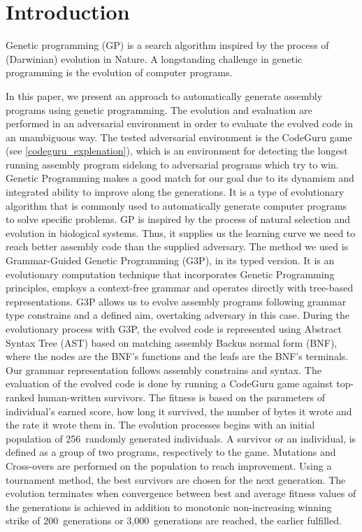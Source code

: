 \documentclass[dvipsnames,format=sigconf,anonymous=true,review=true]{acmart}
\begin{document}
\maketitle

\section{Introduction}
Genetic programming (GP) is a search algorithm inspired by the process of (Darwinian) evolution in Nature. A longstanding challenge in genetic programming is the evolution of computer programs.


In this paper, we present an approach to automatically generate assembly programs using genetic programming. The evolution and evaluation are performed in an adversarial environment in order to evaluate the evolved code in an unambiguous way. The tested adversarial environment is the CodeGuru game (see \autoref{codeguru_explenation}), which is an environment for detecting the longest running assembly program sidelong to adversarial programs which try to win.
Genetic Programming makes a good match for our goal due to its dynamism and integrated ability to improve along the generations. It is a type of evolutionary algorithm that is commonly used to automatically generate computer programs to solve specific problems. GP is inspired by the process of natural selection and evolution in biological systems. Thus, it supplies us the learning curve we need to reach better assembly code than the supplied adversary. The method we used is Grammar-Guided Genetic Programming (G3P), in its typed version. It is an evolutionary computation technique that incorporates Genetic Programming principles, employs a context-free grammar and operates directly with tree-based representations. G3P allows us to evolve assembly programs following grammar type constrains and a defined aim, overtaking adversary in this case. During the evolutionary process with G3P, the evolved code is represented using Abstract Syntax Tree (AST) based on matching assembly Backus normal form (BNF), where the nodes are the BNF's functions and the leafs are the BNF's terminals.
Our grammar representation follows assembly constrains and syntax. The evaluation of the evolved code is done by running a CodeGuru game against top-ranked human-written survivors. The fitness is based on the parameters of individual's earned score, how long it survived, the number of bytes it wrote and the rate it wrote them in. The evolution processes begins with an initial population of 256~randomly generated individuals. A survivor or an individual, is defined as a group of two programs, respectively to the game. Mutations and Cross-overs are performed on the population to reach improvement. Using a tournament method, the best survivors are chosen for the next generation. The evolution terminates when convergence between best and average fitness values of the generations is achieved in addition to monotonic non-increasing winning strike of 200~generations or 3,000~generations are reached, the earlier fulfilled.
\end{document}
